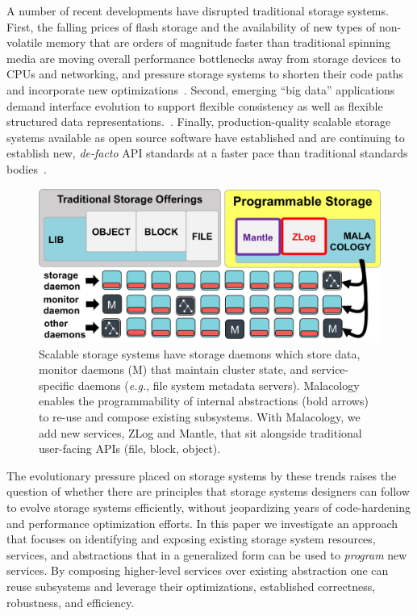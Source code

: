 \documentclass[preprint]{sigplanconf-eurosys}
\begin{document}
A number of recent developments have disrupted traditional storage systems.
First, the falling prices of flash storage and the availability of new types of
non-volatile memory that are orders of magnitude faster than traditional
spinning media are moving overall performance bottlenecks away from storage
devices to CPUs and networking, and pressure storage systems to shorten their
code paths and incorporate new
optimizations~\cite{gray_tape_2007,gray_flash_2008}.  Second, emerging ``big
data'' applications demand interface evolution to support flexible consistency
as well as flexible structured data 
representations.~\cite{apache_contributors_parquet_2014}.  Finally, production-quality scalable
storage systems available as open source software have established and are
continuing to establish new, \emph{de-facto} API standards at a faster pace
than traditional standards
bodies~\cite{snia_implementing_2014,linux_foundation_kinetic_2015}.

\begin{figure}[tb]
\centering
\includegraphics{figures/overview.png}
\caption{Scalable storage systems have storage daemons which store data,
monitor daemons (M) that maintain cluster state, and service-specific daemons
({\it e.g.}, file system metadata servers). Malacology enables the programmability of
internal abstractions (bold arrows) to re-use and compose
existing subsystems.  With Malacology, we add new services, ZLog and
Mantle, that sit alongside traditional user-facing APIs (file, block,
object).}\label{fig:overview}
\end{figure}

The evolutionary pressure placed on storage systems by these trends raises the
question of whether there are principles that storage systems designers can
follow to evolve storage systems efficiently, without jeopardizing years of
code-hardening and performance optimization efforts.  In this paper we
investigate an approach that focuses on identifying and exposing existing
storage system resources, services, and abstractions that in a generalized form
can be used to \emph{program} new services. By composing higher-level services
over existing abstraction one can reuse subsystems and leverage their
optimizations, established correctness, robustness, and efficiency. 
\end{document}
